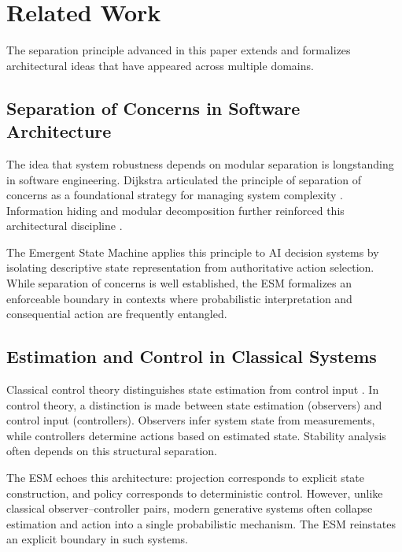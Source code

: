 \documentclass[11pt]{article}
\begin{document}

\section{Related Work}

The separation principle advanced in this paper extends and formalizes architectural ideas that have appeared across multiple domains.

\subsection{Separation of Concerns in Software Architecture}

The idea that system robustness depends on modular separation is longstanding in software engineering. Dijkstra articulated the principle of separation of concerns as a foundational strategy for managing system complexity \citep{dijkstra1974}. Information hiding and modular decomposition further reinforced this architectural discipline \citep{parnas1972}.

The Emergent State Machine applies this principle to AI decision systems by isolating descriptive state representation from authoritative action selection. While separation of concerns is well established, the ESM formalizes an enforceable boundary in contexts where probabilistic interpretation and consequential action are frequently entangled.

\subsection{Estimation and Control in Classical Systems}

Classical control theory distinguishes state estimation from control input \citep{kalman1960, astrom2010}. In control theory, a distinction is made between state estimation (observers) and control input (controllers). Observers infer system state from measurements, while controllers determine actions based on estimated state. Stability analysis often depends on this structural separation.

The ESM echoes this architecture: projection corresponds to explicit state construction, and policy corresponds to deterministic control. However, unlike classical observer–controller pairs, modern generative systems often collapse estimation and action into a single probabilistic mechanism. The ESM reinstates an explicit boundary in such systems.
\end{document}
